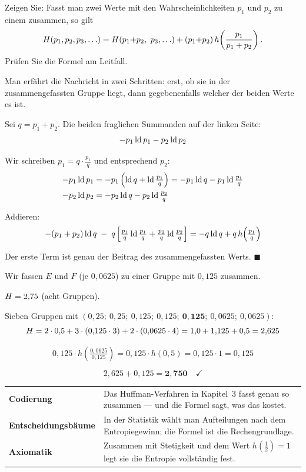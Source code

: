 \begin{aufgabe}
Zeigen Sie: Fasst man zwei Werte mit den Wahrscheinlichkeiten $p_1$ und $p_2$ zu einem zusammen, so gilt
\[ \Ent(p_1,p_2,p_3,\ldots) = \Ent(p_1{+}p_2,\ p_3,\ldots) + (p_1{+}p_2)\,h\!\left(\frac{p_1}{p_1+p_2}\right) . \]
Prüfen Sie die Formel am Leitfall.

\loesung
{}
Man erfährt die Nachricht in zwei Schritten: erst, ob sie in der zusammengefassten Gruppe liegt, dann gegebenenfalls welcher der beiden Werte es ist.

Sei $q = p_1+p_2$. Die beiden fraglichen Summanden auf der linken Seite:
\[ -p_1\operatorname{ld} p_1 - p_2\operatorname{ld} p_2 \]

Wir schreiben $p_1 = q\cdot\frac{p_1}{q}$ und entsprechend $p_2$:
\begin{align*}
-p_1\operatorname{ld} p_1 &= -p_1\left(\operatorname{ld} q + \operatorname{ld}\tfrac{p_1}{q}\right) = -p_1\operatorname{ld} q - p_1\operatorname{ld}\tfrac{p_1}{q}\\
-p_2\operatorname{ld} p_2 &= -p_2\operatorname{ld} q - p_2\operatorname{ld}\tfrac{p_2}{q}
\end{align*}

Addieren:
\[ -(p_1+p_2)\operatorname{ld} q \;-\; q\left[\tfrac{p_1}{q}\operatorname{ld}\tfrac{p_1}{q} + \tfrac{p_2}{q}\operatorname{ld}\tfrac{p_2}{q}\right] = -q\operatorname{ld} q + q\,h\!\left(\tfrac{p_1}{q}\right) \]

Der erste Term ist genau der Beitrag des zusammengefassten Werts. $\blacksquare$

Wir fassen $E$ und $F$ (je $0{,}0625$) zu einer Gruppe mit $0{,}125$ zusammen.

 $H = 2{,}75$ (acht Gruppen).

 Sieben Gruppen mit $(0{,}25;\ 0{,}25;\ 0{,}125;\ 0{,}125;\ \mathbf{0{,}125};\ 0{,}0625;\ 0{,}0625)$:
\[ H = 2\cdot0{,}5 + 3\cdot(0{,}125\cdot3) + 2\cdot(0{,}0625\cdot4) = 1{,}0 + 1{,}125 + 0{,}5 = 2{,}625 \]

\[ 0{,}125 \cdot h\!\left(\tfrac{0{,}0625}{0{,}125}\right) = 0{,}125 \cdot h(0{,}5) = 0{,}125 \cdot 1 = 0{,}125 \]

\[ 2{,}625 + 0{,}125 = \mathbf{2{,}750} \quad \checkmark \]

\begin{center}
{\small
\renewcommand{\arraystretch}{1.5}
\begin{tabular}{@{}P{3.0cm}P{5.6cm}@{}}
\toprule
\textbf{Codierung} & Das Huffman-Verfahren in Kapitel~3 fasst genau so zusammen --- und die Formel sagt, was das kostet.\\
\textbf{Entscheidungs\-bäume} & In der Statistik wählt man Aufteilungen nach dem Entropiegewinn; die Formel ist die Rechengrundlage.\\
\textbf{Axiomatik} & Zusammen mit Stetigkeit und dem Wert $h(\frac12)=1$ legt sie die Entropie vollständig fest.\\
\bottomrule
\end{tabular}}
\end{center}


\end{aufgabe}

